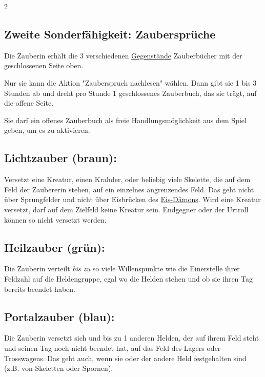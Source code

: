 \documentclass[10pt, a4paper, oneside]{book}
\newcommand{\fan}[1]{\textit{#1}}
\begin{document}
\begin{multicols*}{2}
\begin{bgcolor}
\subsection{Zweite Sonderfähigkeit: Zaubersprüche}

Die Zauberin erhält die 3 verschiedenen \hyperref[Gegenstände und Sonderplättchen]{Gegenstände} Zauberbücher mit der geschlossenen Seite oben.

Nur sie kann die Aktion "Zauberspruch nachlesen" wählen. Dann gibt sie 1 bis 3 Stunden ab und dreht pro Stunde 1 geschlossenes Zauberbuch, das sie trägt, auf die offene Seite. 

Sie darf ein offenes Zauberbuch als freie Handlungsmöglichkeit aus dem Spiel geben, um es zu aktivieren.
\supercite{DlH:Begleitheft,DlH11:Heldenkarte_Zauberer}





\subsection{Lichtzauber (braun):} 

Versetzt eine Kreatur, einen Krahder, oder beliebig viele Skelette, die auf dem Feld der Zaubererin stehen, auf ein einzelnes angrenzendes Feld. Das geht nicht über Sprungfelder und nicht über Eisbrücken des \hyperref[Eis-Dämon]{Eis-Dämons}. Wird eine Kreatur versetzt, darf auf dem Zielfeld keine Kreatur sein.
\supercite{DlH11:Heldenkarte_Zauberer}
Endgegner oder der Urtroll\supercite{DlH:FAQ} können so nicht versetzt werden.



\subsection{Heilzauber (grün):} 

Die Zauberin verteilt \fan{bis zu} so viele Willenspunkte wie die Einerstelle ihrer Feldzahl auf die Heldengruppe, egal wo die Helden stehen und ob sie ihren Tag bereits beendet haben.


\columnbreak


\subsection{Portalzauber (blau):} 

Die Zauberin versetzt sich und bis zu 1 anderen Helden, der auf ihrem Feld steht und seinen Tag noch nicht beendet hat, auf das Feld des Lagers oder Trosswagens. Das geht auch, wenn sie oder der andere Held festgehalten sind (z.B. von Skeletten oder Spornen).
\supercite{DlH:Begleitheft,40664}



\end{bgcolor}
\end{multicols*}
\end{document}
